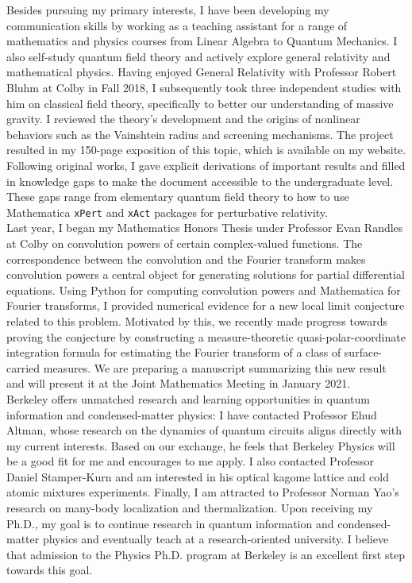 \documentclass[12pt]{article}
\begin{document}
Besides pursuing my primary interests, I have been developing my communication skills by working as a teaching assistant for a range of mathematics and physics courses from Linear Algebra to Quantum Mechanics. I also self-study quantum field theory and actively explore general relativity and mathematical physics. Having enjoyed General Relativity with Professor Robert Bluhm at Colby in Fall 2018, I subsequently took three independent studies with him on classical field theory, specifically to better our understanding of massive gravity. I reviewed the theory's development and the origins of nonlinear behaviors such as the Vainshtein radius and screening mechanisms. The project resulted in my 150-page exposition of this topic, which is available on my website. Following original works, I gave explicit derivations of important results and filled in knowledge gaps to make the document accessible to the undergraduate level. These gaps range from elementary quantum field theory to how to use Mathematica \texttt{xPert} and \texttt{xAct} packages for perturbative relativity. \\ 

Last year, I began my Mathematics Honors Thesis under Professor Evan Randles at Colby on convolution powers of certain complex-valued functions. The correspondence between the convolution and the Fourier transform makes convolution powers a central object for generating solutions for partial differential equations. Using Python for computing convolution powers and Mathematica for Fourier transforms, I provided numerical evidence for a new local limit conjecture related to this problem. Motivated by this, we recently made progress towards proving the conjecture by constructing a measure-theoretic quasi-polar-coordinate integration formula for estimating the Fourier transform of a class of surface-carried measures. We are preparing a manuscript summarizing this new result and will present it at the Joint Mathematics Meeting in January 2021. \\ 

Berkeley offers unmatched research and learning opportunities in quantum information and condensed-matter physics: I have contacted Professor Ehud Altman, whose research on the dynamics of quantum circuits aligns directly with my current interests. Based on our exchange, he feels that Berkeley Physics will be a good fit for me and encourages to me apply. I also contacted Professor Daniel Stamper-Kurn and am interested in his optical kagome lattice and cold atomic mixtures experiments. Finally, I am attracted to Professor Norman Yao's research on many-body localization and thermalization. Upon receiving my Ph.D., my goal is to continue research in quantum information and condensed-matter physics and eventually teach at a research-oriented university. I believe that admission to the Physics Ph.D. program at Berkeley is an excellent first step towards this goal.  

	

















	
	
	
	
	
\end{document}
